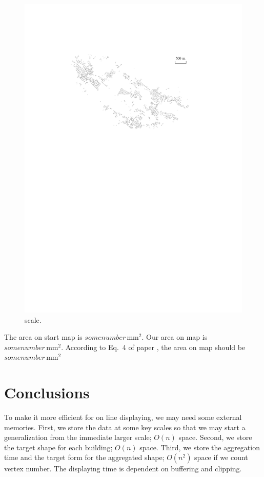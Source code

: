 \documentclass[graybox]{svmult}
\newcommand{\eq}{Eq.~}
\begin{document}
\begin{figure}[tb]
	\centering
	\includegraphics{Data}
	\caption{scale.}
	\label{fig:Data}
\end{figure}



The area on start map is $some number\,\text{mm}^2$.
Our area on map is $some number\,\text{mm}^2$.
According to \eq4 of paper \textcite{Topfer1966}, 
the area on map should be $some number\,\text{mm}^2$



\section{Conclusions}
\label{sec:Conclusions}


To make it more efficient for on line displaying, we may need 
some external memories. First, we store the data at some key 
scales so that we may start a generalization from the immediate 
larger scale; $O(n)$ space. Second, we store the target shape 
for each building; $O(n)$ space. Third, we store the aggregation 
time and the target form for the aggregated shape; $O(n^2)$ 
space if we count vertex number.
%
The displaying time is dependent on buffering and clipping.
\end{document}
